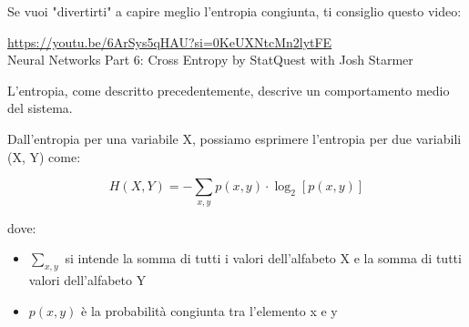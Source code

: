 \begin{tcolorbox}
    Se vuoi "divertirti" a capire meglio l'entropia congiunta, ti consiglio questo video: \newline 

    \url{https://youtu.be/6ArSys5qHAU?si=0KeUXNtcMn2lytFE} \\
    Neural Networks Part 6: Cross Entropy by StatQuest with Josh Starmer

\end{tcolorbox}

L'entropia, come descritto precedentemente, descrive un comportamento medio del sistema. \newline 

Dall'entropia per una variabile X, possiamo esprimere l'entropia per due variabili (X, Y) come: 

{
    \Large 
    \begin{equation}
        H (X, Y)
        = 
        - \sum_{x ,y}
        p(x, y) \cdot \log_{2} \left[ p(x,y)\right]
    \end{equation}
}

dove: 

\begin{itemize}
    \item $\sum_{x ,y}$ si intende la somma di tutti i valori dell'alfabeto X e la somma di tutti valori dell'alfabeto Y 
    \item $ p(x, y)$ è la probabilità congiunta tra l'elemento x e y
\end{itemize}


